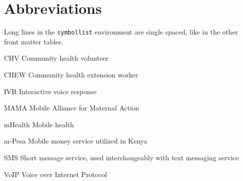 \abbreviations


%
%

\section*{Abbreviations}

Long lines in the \texttt{symbollist} environment are single spaced, like in
the other front matter tables.

\begin{symbollist}
	\item[CHV] Community health volunteer
	\item[CHEW] Community health extension worker
	\item[IVR] Interactive voice response
	\item[MAMA] Mobile Alliance for Maternal Action
	\item[mHealth] Mobile health
	\item[m-Pesa] Mobile money service utilized in Kenya
	\item[SMS] Short message service, used interchangeably with text messaging service
	\item[VoIP] Voice over Internet Protocol
\end{symbollist}
